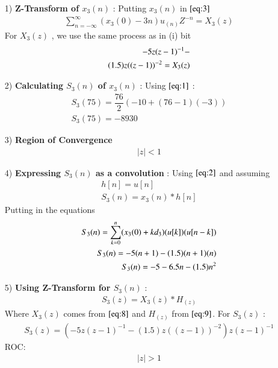 \documentclass[journal,12pt,twocolumn]{IEEEtran}
\theoremstyle{remark}
\begin{document}
\begin{enumerate}
\item[1)] 
\textbf{Z-Transform of $x_3(n)$} :
Putting $x_3(n)$ in $\eqref{eq:3}$
\vspace{0.05cm}
\begin{align}
\sum_{n=-\infty}^{\infty}(x_3(0) -3n)u_{(n)}Z^{-n} =X_3(z)
\end{align}
For $X_3(z)$ , we use the same process as in (i) bit\vspace{0.05cm}
\begin{align}
  \notag -5z(z-1)^{-1}-\\
       (1.5)z((z-1))^{-2}=X_3(z) \label{eq:8}
\end{align}
\item[2)]
\textbf{Calculating $S_3(n)$ of $x_3(n)$} :
Using $\eqref{eq:1}$ :\vspace{0.05cm}
\begin{align}
    S_3(75)=\dfrac{76}{2}(-10+(76-1)(-3))\\
   S_3(75)=-8930
    \end{align}
     \item[3)]
 \textbf{Region of Convergence}
\vspace{0.05cm}
\begin{align}
    \lvert z\rvert  <  1 
    \end{align}


\vspace{0.05cm}
    \vspace{0.7cm}
\item[4)]
\textbf{Expressing $S_3(n)$ as a convolution} :
Using $\eqref{eq:2}$ and assuming 
\begin{align}
         h[n]=u[n] \\
    S_3(n) = x_3(n) * h[n] 
\end{align}
Putting in the equations
\begin{align}
     S_3(n) = \sum_{k=0}^{n}(x_3(0) + kd_3)
 \notag    (u[k])(u[n-k])   \\
 S_3(n) = -5(n+1) -(1.5)(n+1)(n)  \\
  S_3(n) = -5 - 6.5n - (1.5)n^2
\end{align}
\item[5)]
\textbf{Using Z-Transform for $S_3(n)$} :
\begin{align}
    S_3(z) = X_3(z) * H_(z)
    \end{align}
    Where $X_3(z)$ comes from $\eqref{eq:8}$ and $H_(z)$ from $\eqref{eq:9}$.
    \vspace{0.05cm}
    For $S_3(z)$ :
    \begin{align}
            S_3(z) = (-5z(z-1)^{-1}-
       (1.5)z((z-1))^{-2})z(z-1)^{-1}
    \end{align}
    ROC:
    \begin{align} 
    \lvert z \rvert > 1
    \end{align}
    

\end{enumerate}
\end{document}
